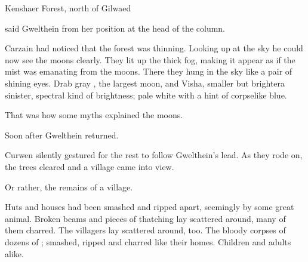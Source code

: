 \stamp
  {\dateSortieFindsTown}
  {Kenshaer Forest, north of Gilwaed}

\begin{comment}
\chapter{Old version}
\end{comment}
\begin{comment}
\section{Gilwaed in ruins}
\end{comment}

 said Gwelthein from her position at the head of the column. 

Carzain had noticed that the forest was thinning. 
Looking up at the sky he could now see the moons clearly. 
They lit up the thick fog, making it appear as if the mist was emanating from the moons. 
There they hung in the sky like a pair of shining eyes. 
Drab gray \Dun, the largest moon, and Visha, smaller but brighter\dash a sinister, spectral kind of brightness; pale white with a hint of corpselike blue. 

That was how some myths explained the moons. 

Soon after Gwelthein returned. 

Curwen silently gestured for the rest to follow Gwelthein's lead. 
As they rode on, the trees cleared and a village came into view. 

Or rather, the remains of a village. 

Huts and houses had been smashed and ripped apart, seemingly by some great animal. 
Broken beams and pieces of thatching lay scattered around, many of them charred. 
The villagers lay scattered around, too. 
The bloody corpses of dozens of \scathae{}; smashed, ripped and charred like their homes. 
Children and adults alike. 

